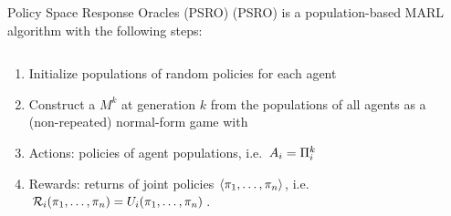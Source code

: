 \begin{frame}[t]{Policy Space Response Oracles (PSRO)}
     (PSRO) is a population-based MARL algorithm with the following steps:

    \vspace{1em}

    \begin{columns}
        \begin{column}{0.65\textwidth}
            \begin{enumerate}
                \item<2-> Initialize populations of random policies for each agent
                \item<3-> Construct a  $M^k$ at generation $k$ from the populations of all agents as a (non-repeated) normal-form game with
                    \blist
                        \item Actions: policies of agent populations, i.e.\ $A_i = \Pi_i^k$
                        \item Rewards: returns of joint policies $\langle \pi_1, \ldots, \pi_n \rangle$, i.e.\ $\mathcal{R}_i(\pi_1, \ldots, \pi_n) = U_i(\pi_1, \ldots, \pi_n)$.
                    \elist
            \end{enumerate}
        \end{column}
        \begin{column}{0.3\textwidth}
        \end{column}
    \end{columns}

\end{frame}

